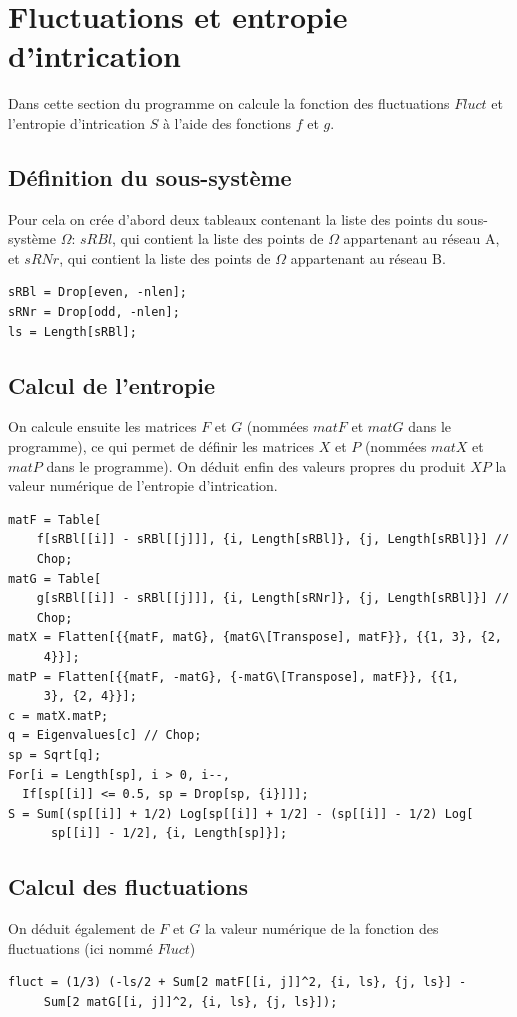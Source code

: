\documentclass[a4paper, french]{report}
\newcommand{\om}{\ensuremath{\Omega}\xspace}
\newcommand{\1}{\ensuremath{\ket{\om_1\bom_1}}\xspace}
\newcommand{\2}{\ensuremath{\ket{\om_2\bom_2}}\xspace}
\begin{document}
\section{Fluctuations et entropie d'intrication}
Dans cette section du programme on calcule la fonction des fluctuations $Fluct$ et l'entropie d'intrication $S$ à l'aide des fonctions $f$ et $g$.

\subsection{Définition du sous-système}
Pour cela on crée d'abord deux tableaux contenant la liste des points du sous-système \om : $sRBl$, qui contient la liste des points de \om appartenant au réseau A, et $sRNr$, qui contient la liste des points de \om appartenant au réseau B.
\begin{lstlisting}
sRBl = Drop[even, -nlen];
sRNr = Drop[odd, -nlen];
ls = Length[sRBl];
\end{lstlisting}

\subsection{Calcul de l'entropie}

On calcule ensuite les matrices $F$ et $G$ (nommées $matF$ et $matG$ dans le programme), ce qui permet de définir les matrices $X$ et $P$ (nommées $matX$ et $matP$ dans le programme). On déduit enfin des valeurs propres du produit $XP$ la valeur numérique de l'entropie d'intrication.
\begin{lstlisting}
matF = Table[
    f[sRBl[[i]] - sRBl[[j]]], {i, Length[sRBl]}, {j, Length[sRBl]}] //
    Chop;
matG = Table[
    g[sRBl[[i]] - sRBl[[j]]], {i, Length[sRNr]}, {j, Length[sRBl]}] //
    Chop;
matX = Flatten[{{matF, matG}, {matG\[Transpose], matF}}, {{1, 3}, {2, 
     4}}];
matP = Flatten[{{matF, -matG}, {-matG\[Transpose], matF}}, {{1, 
     3}, {2, 4}}];
c = matX.matP;
q = Eigenvalues[c] // Chop;
sp = Sqrt[q];
For[i = Length[sp], i > 0, i--, 
  If[sp[[i]] <= 0.5, sp = Drop[sp, {i}]]];
S = Sum[(sp[[i]] + 1/2) Log[sp[[i]] + 1/2] - (sp[[i]] - 1/2) Log[
      sp[[i]] - 1/2], {i, Length[sp]}];
\end{lstlisting}

\subsection{Calcul des fluctuations}
On déduit également de $F$ et $G$ la valeur numérique de la fonction des fluctuations (ici nommé $Fluct$)
\begin{lstlisting}
fluct = (1/3) (-ls/2 + Sum[2 matF[[i, j]]^2, {i, ls}, {j, ls}] - 
     Sum[2 matG[[i, j]]^2, {i, ls}, {j, ls}]);
\end{lstlisting}
\end{document}
